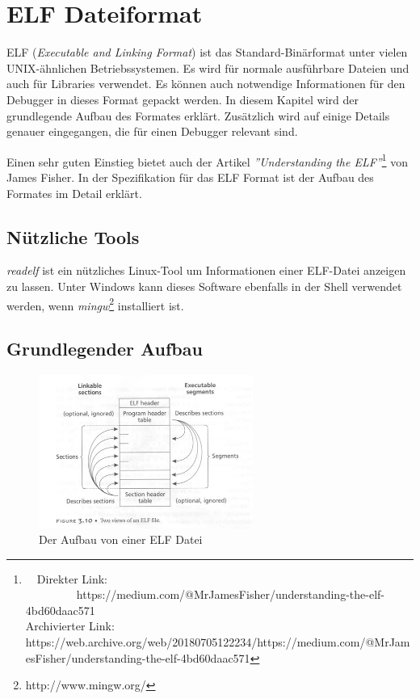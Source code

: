 \chapter{ELF Dateiformat}
ELF (\textit{Executable and Linking Format}) ist das Standard-Binärformat unter vielen UNIX-ähnlichen Betriebssystemen.
Es wird für normale ausführbare Dateien und auch für Libraries verwendet.
Es können auch notwendige Informationen für den Debugger in dieses Format gepackt werden.
In diesem Kapitel wird der grundlegende Aufbau des Formates erklärt.
Zusätzlich wird auf einige Details genauer eingegangen, die für einen Debugger relevant sind.

Einen sehr guten Einstieg bietet auch der Artikel \textit{''Understanding the ELF''}\footnote{\ \ Direkter Link: \ \ \ \ \ \ \ \ \ https://medium.com/@MrJamesFisher/understanding-the-elf-4bd60daac571\\ Archivierter Link: https://web.archive.org/web/20180705122234/https://medium.com/@MrJamesFisher/understanding-the-elf-4bd60daac571} von James Fisher.
In der Spezifikation für das ELF Format\cite{bib:ELFSpecification} ist der Aufbau des Formates im Detail erklärt.


\section{Nützliche Tools}
\textit{readelf} ist ein nützliches Linux-Tool um Informationen einer ELF-Datei anzeigen zu lassen.
Unter Windows kann dieses Software ebenfalls in der Shell verwendet werden, wenn \textit{mingw}\footnote{http://www.mingw.org/} installiert ist.

\section{Grundlegender Aufbau}
\begin{figure}[htbp]
	\centering
		\includegraphics[width=7cm,keepaspectratio]{images/ELFStructure.jpg}
	\caption[Der Aufbau von einer ELF Datei]{Der Aufbau von einer ELF Datei\footnotemark}
	\label{fig:ELFStructure}
\end{figure}

